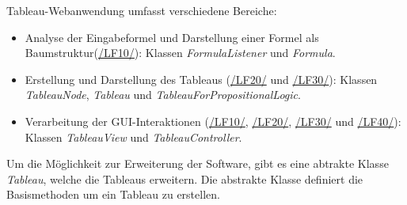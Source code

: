 Tableau-Webanwendung umfasst verschiedene Bereiche:
\begin{itemize}
\item	Analyse der Eingabeformel und Darstellung einer Formel als Baumstruktur(\hyperlink{/LF10/}{/LF10/}): Klassen \textit{FormulaListener} und \textit{Formula}.
\item	Erstellung und Darstellung des Tableaus (\hyperlink{/LF20/}{/LF20/} und \hyperlink{/LF30/}{/LF30/}):  Klassen \textit{TableauNode}, \textit{Tableau} und \textit{TableauForPropositionalLogic}.
\item	Verarbeitung der GUI-Interaktionen (\hyperlink{/LF10/}{/LF10/}, \hyperlink{/LF20/}{/LF20/}, \hyperlink{/LF30/}{/LF30/} und \hyperlink{/LF40/}{/LF40/}): Klassen \textit{TableauView} und \textit{TableauController}.
\end{itemize}

Um die Möglichkeit zur Erweiterung der Software, gibt es eine abtrakte Klasse \textit{Tableau}, welche die Tableaus erweitern. Die abstrakte Klasse definiert die Basismethoden um ein Tableau zu erstellen. 

